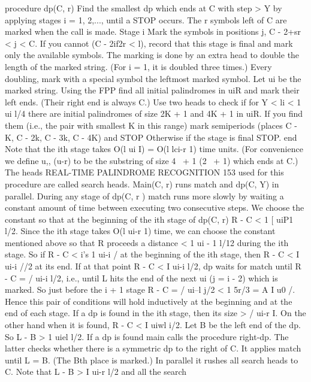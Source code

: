 \documentclass[11pt,a4paper]{report}
\begin{document}
procedure dp(C, r)
Find the smallest dp which ends at C with step > Y by
applying stages i = 1, 2,..., until a STOP occurs. The r symbols
left of C are marked when the call is made.
Stage i
Mark the symbols in positions j, C - 2+sr < j < C. If you cannot
(C - 2if2r < l), record that this stage is final and mark only the
available symbols. The marking is done by an extra head to double
the length of the marked string. (For i = 1, it is doubled three times.)
Every doubling, mark with a special symbol the leftmost marked
symbol.
Let ui be the marked string.
Using the FPP find all initial palindromes in uiR and mark their
left ends. (Their right end is always C.)
Use two heads to check if for Y < li < 1 ui l/4 there are initial
palindromes of size 2K + 1 and 4K + 1 in uiR.
If you find them (i.e., the pair with smallest K in this range)
mark semiperiods (places C - K, C - 2k, C - 3k, C - 4K) and STOP
Otherwise if the stage is final STOP.
end
Note that the ith stage takes O(l ui I) = O(l lci-r 1) time units. (For convenience we
define u,, (u-r) to be the substring of size 4~ + 1 (2~ + 1) which ends at C.) The heads 
REAL-TIME PALINDROME RECOGNITION 153
used for this procedure are called search heads. Main(C, r) runs match and dp(C, Y) in
parallel. During any stage of dp(C, r ) match runs more slowly by waiting a constant
amount of time between executing two consecutive steps. We choose the constant so that
at the beginning of the ith stage of dp(C, r) R - C < 1%
[ uiP1 l/2. Since the ith stage takes O(l ui-r 1) time, we can choose the constant mentioned
above so that R proceeds a distance < 1 ui - 1 l/12 during the ith stage. So if R - C <
i’s 1 ui-i / at the beginning of the ith stage, then R - C < I ui-i //2 at its end. If at that
point R - C < I ui-i l/2, dp waits for match until R - C = / ui-i l/2, i.e., until L hits
the end of the next ui (j = i - 2) which is marked. So just before the i + 1 stage
R - C = / ui--l j/2 < 1%
5r/3 = A I u0 /. Hence this pair of conditions will hold inductively at the beginning and
at the end of each stage.
If a dp is found in the ith stage, then its size > / ui-r I. On the other hand when it is
found, R - C < I uiwl i/2. Let B be the left end of the dp. So L - B > 1 uiel l/2.
If a dp is found main calls the procedure right-dp. The latter checks whether there is a
symmetric dp to the right of C. It applies match until L = B. (The Bth place is marked.)
In parallel it rushes all search heads to C. Note that L - B > I ui-r l/2 and all the search
\end{document}
